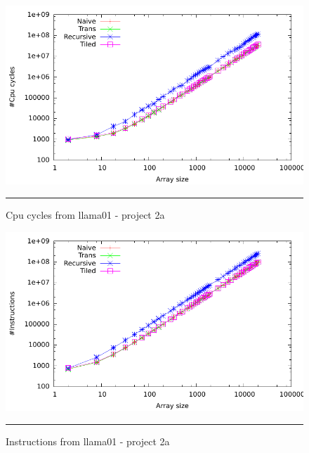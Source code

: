 \begin{figure}[ht]
	\centering
		\includegraphics[width=\textwidth]{./Appendices/Figures/Project2a/Cpu_cycles_putty.pdf}
		\rule{35em}{0.5pt}
	\caption[Cpu cycles]{
	Cpu cycles from llama01 - project 2a
	}
	\label{fig:Cpu_cycles_p2putty}
\end{figure}
\begin{figure}[ht]
	\centering
		\includegraphics[width=\textwidth]{./Appendices/Figures/Project2a/Instructions_putty.pdf}
		\rule{35em}{0.5pt}
	\caption[Instructions]{
	Instructions from llama01 - project 2a
	}
	\label{fig:Instructions_p2putty}
\end{figure}

